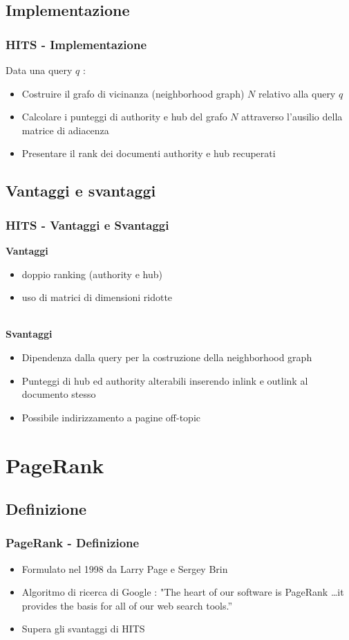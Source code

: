 \documentclass{beamer}
\begin{document}
\subsection{Implementazione}
\begin{frame}
	\frametitle{HITS - Implementazione}
	Data una query $q$ :
	\begin{itemize}
		\item Costruire il grafo di vicinanza (neighborhood graph) $N$ relativo alla query $q$
		\item Calcolare i punteggi di authority e hub del grafo $N$ attraverso l'ausilio della matrice di adiacenza
		\item Presentare il rank dei documenti authority e hub recuperati
	\end{itemize}
\end{frame}
\subsection{Vantaggi e svantaggi}
\begin{frame}
	\frametitle{HITS - Vantaggi e Svantaggi}
	\textbf{Vantaggi}
	\begin{itemize}
		\item doppio ranking (authority e hub)
		\item uso di matrici di dimensioni ridotte \\~\\
	\end{itemize}
	\textbf{Svantaggi}
	\begin{itemize}
		\item Dipendenza dalla query per la costruzione della neighborhood graph
		\item Punteggi di hub ed authority alterabili inserendo inlink e outlink al documento stesso
		\item Possibile indirizzamento a pagine off-topic
	\end{itemize}
\end{frame}

\section{PageRank}
\subsection{Definizione}
\begin{frame}
	\frametitle{PageRank - Definizione}
	\begin{itemize}
		\item Formulato nel 1998 da Larry Page e Sergey Brin
		\item Algoritmo di ricerca di Google : "The heart of our software is PageRank \texttrademark\dots it provides the basis for all of our web search tools.''
		\item Supera gli svantaggi di HITS
	\end{itemize}
\end{frame}
\end{document}
